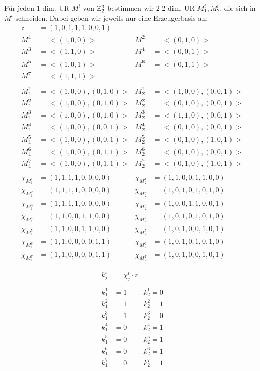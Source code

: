 Für jeden 1-dim. UR $M^i$ von $\mathbb{Z}_2^3$ bestimmen wir 2 2-dim. UR $M^i_1, M^i_2$, die sich in $M^i$ schneiden. Dabei geben wir jeweils nur eine Erzeugerbasis an:
\begin{align*}
z&=(1,0,1,1,1,0,0,1)\\
M^1&=<(1, 0, 0)>&M^2&=<(0, 1, 0)>\\
M^3&=<(1, 1, 0)>&M^4&=<(0, 0, 1)>\\
M^5&=<(1, 0, 1)>&M^6&=<(0, 1, 1)>\\
M^7&=<(1, 1, 1)>\\\\
M^1_1&=<(1, 0, 0), (0, 1, 0)>&M^1_2&=<(1, 0, 0), (0, 0, 1)>\\
M^2_1&=<(1, 0, 0), (0, 1, 0)>&M^2_2&=<(0, 1, 0), (0, 0, 1)>\\
M^3_1&=<(1, 0, 0), (0, 1, 0)>&M^3_2&=<(1, 1, 0), (0, 0, 1)>\\
M^4_1&=<(1, 0, 0), (0, 0, 1)>&M^4_2&=<(0, 1, 0), (0, 0, 1)>\\
M^5_1&=<(1, 0, 0), (0, 0, 1)>&M^5_2&=<(0, 1, 0), (1, 0, 1)>\\
M^6_1&=<(1, 0, 0), (0, 1, 1)>&M^6_2&=<(0, 1, 0), (0, 0, 1)>\\
M^7_1&=<(1, 0, 0), (0, 1, 1)>&M^7_2&=<(0, 1, 0), (1, 0, 1)>\\\\
\chi_{M^1_1}&=(1, 1, 1, 1, 0, 0, 0, 0)&\chi_{M^1_2}&=(1, 1, 0, 0, 1, 1, 0, 0)\\
\chi_{M^2_1}&=(1, 1, 1, 1, 0, 0, 0, 0)&\chi_{M^2_2}&=(1, 0, 1, 0, 1, 0, 1, 0)\\
\chi_{M^3_1}&=(1, 1, 1, 1, 0, 0, 0, 0)&\chi_{M^3_2}&=(1, 0, 0, 1, 1, 0, 0, 1)\\
\chi_{M^4_1}&=(1, 1, 0, 0, 1, 1, 0, 0)&\chi_{M^4_2}&=(1, 0, 1, 0, 1, 0, 1, 0)\\
\chi_{M^5_1}&=(1, 1, 0, 0, 1, 1, 0, 0)&\chi_{M^5_2}&=(1, 0, 1, 0, 0, 1, 0, 1)\\
\chi_{M^6_1}&=(1, 1, 0, 0, 0, 0, 1, 1)&\chi_{M^6_2}&=(1, 0, 1, 0, 1, 0, 1, 0)\\
\chi_{M^7_1}&=(1, 1, 0, 0, 0, 0, 1, 1)&\chi_{M^7_2}&=(1, 0, 1, 0, 0, 1, 0, 1)\\\\
\end{align*}
\begin{align*}
k^i_j&=\chi^i_j\cdot z\\\\
k^1_1&=1&k^1_2=0\\
k^2_1&=1&k^2_2=1\\
k^3_1&=1&k^3_2=0\\
k^4_1&=0&k^4_2=1\\
k^5_1&=0&k^5_2=1\\
k^6_1&=0&k^6_2=1\\
k^7_1&=0&k^7_2=1\\
\end{align*}
